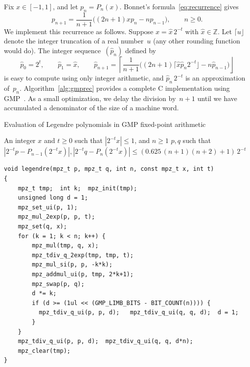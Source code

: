 \documentclass{siamart0216}
\begin{document}
Fix $x \in [-1, 1]$, and let $p_n = P_n(x)$.
Bonnet's formula~\eqref{eq:recurrence} gives
\begin{equation} \label{eq:rec-bis}
  p_{n + 1} =
    \frac{1}{n+1}
    \bigl( (2n +1) x p_n - n p_{n-1} \bigr),
  \qquad n \geq 0.
\end{equation}
We implement this recurrence as follows.
Suppose $x = \hat x \, 2^{-t}$ with $\hat x \in \mathbb Z$.
Let $\lceil u \rfloor$ denote the integer truncation of a real
number~$u$ (any other rounding function would do).
The integer sequence $(\hat p_n)$ defined by
\begin{equation} \label{eq:rec-fxpt}
  \hat{p}_0 = 2^t, \qquad
  \hat{p}_1 = \hat x, \qquad
  \hat{p}_{n + 1} =
    \left\lceil \frac{1}{n + 1}  \bigl( (2 n + 1) \lceil \hat{x}
      \hat{p}_n 2^{- t} \rfloor - n \hat{p}_{n - 1} \bigr)
    \right\rfloor
\end{equation}
is easy to compute using only integer arithmetic, and
$\hat p_n \, 2^{-t}$ is an approximation of $p_n$.
Algorithm~\ref{alg:gmprec} provides a complete C implementation
using GMP~\cite{granlund2017}.
As a small optimization, we delay the division by~$n+1$ until we have
accumulated a denominator of the size of a machine word.

\begin{algorithm}[h!]
  \caption{Evaluation of Legendre polynomials in GMP fixed-point arithmetic}
  \small
  \label{alg:gmprec}
  \begin{algorithmic}[1]
    \Require An integer $x$ and $t \ge 0$ such that $|2^{-t} x| \le 1$, and $n \ge 1$
    \Ensure $p, q$ such that $|2^{-t} p - P_{n-1}(2^{-t} x)|, |2^{-t} q - P_{n}(2^{-t} x)| \le (0.625 \, (n+1)(n+2) + 1) \, 2^{-t}$
  \end{algorithmic}
\begin{verbatim}
void legendre(mpz_t p, mpz_t q, int n, const mpz_t x, int t)
{
    mpz_t tmp;  int k;  mpz_init(tmp);
    unsigned long d = 1;
    mpz_set_ui(p, 1);
    mpz_mul_2exp(p, p, t);
    mpz_set(q, x);
    for (k = 1; k < n; k++) {
        mpz_mul(tmp, q, x);
        mpz_tdiv_q_2exp(tmp, tmp, t);
        mpz_mul_si(p, p, -k*k);
        mpz_addmul_ui(p, tmp, 2*k+1);
        mpz_swap(p, q);
        d *= k;
        if (d >= (1ul << (GMP_LIMB_BITS - BIT_COUNT(n)))) {
          mpz_tdiv_q_ui(p, p, d);   mpz_tdiv_q_ui(q, q, d);  d = 1;
        }
    }
    mpz_tdiv_q_ui(p, p, d);  mpz_tdiv_q_ui(q, q, d*n);
    mpz_clear(tmp);
}
\end{verbatim}
\end{algorithm}
\end{document}
